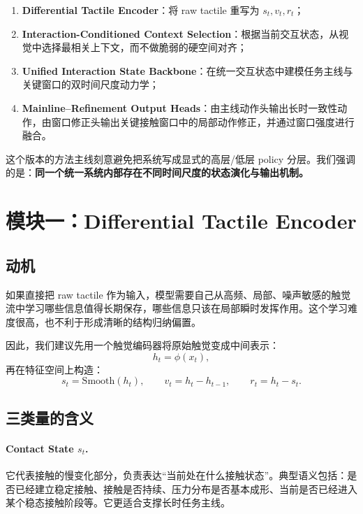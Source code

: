 \documentclass[11pt]{article}
\begin{document}
\begin{enumerate}[leftmargin=2.2em,label=\textbf{模块 \arabic*.}]
    \item \textbf{Differential Tactile Encoder}：将 raw tactile 重写为 $s_t,v_t,r_t$；
    \item \textbf{Interaction-Conditioned Context Selection}：根据当前交互状态，从视觉中选择最相关上下文，而不做脆弱的硬空间对齐；
    \item \textbf{Unified Interaction State Backbone}：在统一交互状态中建模任务主线与关键窗口的双时间尺度动力学；
    \item \textbf{Mainline--Refinement Output Heads}：由主线动作头输出长时一致性动作，由窗口修正头输出关键接触窗口中的局部动作修正，并通过窗口强度进行融合。
\end{enumerate}

这个版本的方法主线刻意避免把系统写成显式的高层/低层 policy 分层。我们强调的是：\textbf{同一个统一系统内部存在不同时间尺度的状态演化与输出机制。}

\section{模块一：Differential Tactile Encoder}

\subsection{动机}

如果直接把 raw tactile 作为输入，模型需要自己从高频、局部、噪声敏感的触觉流中学习哪些信息值得长期保存，哪些信息只该在局部瞬时发挥作用。这个学习难度很高，也不利于形成清晰的结构归纳偏置。

因此，我们建议先用一个触觉编码器将原始触觉变成中间表示：
\[
h_t = \phi(x_t),
\]
再在特征空间上构造：
\[
s_t = \mathrm{Smooth}(h_t), \qquad
v_t = h_t - h_{t-1}, \qquad
r_t = h_t - s_t.
\]

\subsection{三类量的含义}

\paragraph{Contact State $s_t$.}
它代表接触的慢变化部分，负责表达“当前处在什么接触状态”。典型语义包括：是否已经建立稳定接触、接触是否持续、压力分布是否基本成形、当前是否已经进入某个稳态接触阶段等。它更适合支撑长时任务主线。
\end{document}

